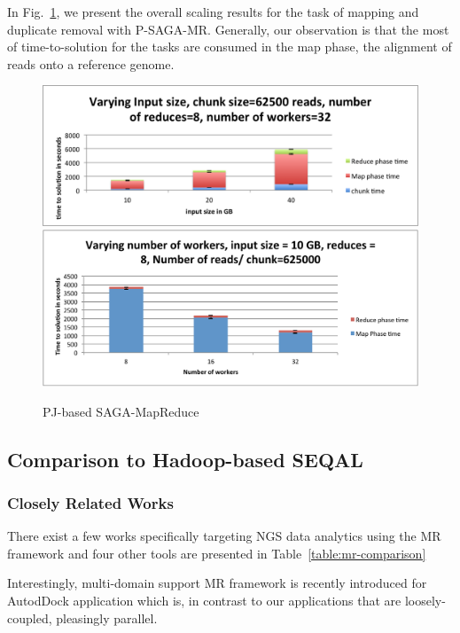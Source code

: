 \documentclass{sig-alternate}
\begin{document}
 In Fig.~\ref{fig:scale-pj-saga-mr}, we present the overall scaling results for the task of mapping and duplicate removal with P-SAGA-MR.  Generally, our observation is that the most of time-to-solution for the tasks are consumed in the map phase, the alignment of reads onto a reference genome.  



\begin{figure}
 \centering
\includegraphics[scale=0.45]{figures/pj-smr-tts.png} 
\includegraphics[scale=0.42]{figures/pj-smr-scale.pdf}


\caption{\small PJ-based SAGA-MapReduce}
  \label{fig:scale-pj-saga-mr} 
\end{figure}


\subsection{Comparison to Hadoop-based SEQAL}
\subsubsection{Closely Related Works}
There exist a few works specifically targeting NGS data analytics using the MR framework and four other tools are presented in Table~\ref{table:mr-comparison}

Interestingly, multi-domain support MR framework is recently introduced for AutodDock application which is, in contrast to our applications that are loosely-coupled, pleasingly parallel.\cite{ecmls11-mr-autodock}
\end{document}
